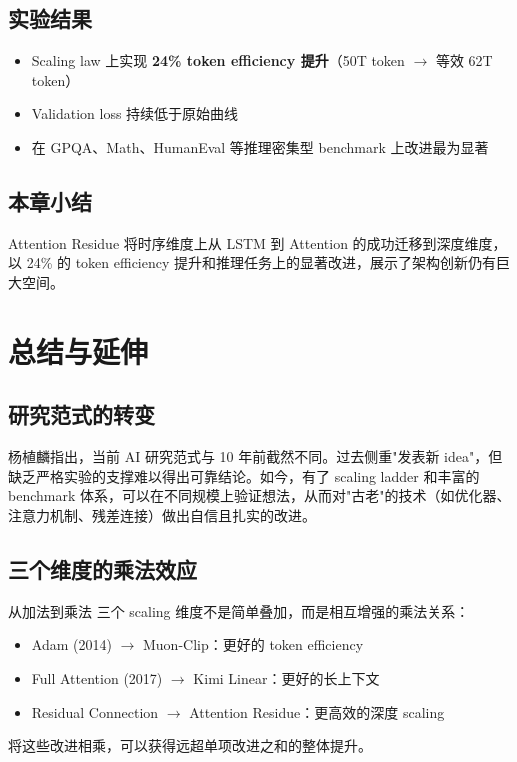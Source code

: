 \documentclass[a4paper]{article}
\begin{document}
\subsection{实验结果}

\begin{itemize}
    \item Scaling law 上实现 \textbf{24\% token efficiency 提升}（50T token $\rightarrow$ 等效 62T token）
    \item Validation loss 持续低于原始曲线
    \item 在 GPQA、Math、HumanEval 等推理密集型 benchmark 上改进最为显著
\end{itemize}

\subsection{本章小结}

Attention Residue 将时序维度上从 LSTM 到 Attention 的成功迁移到深度维度，以 24\% 的 token efficiency 提升和推理任务上的显著改进，展示了架构创新仍有巨大空间。


\section{总结与延伸}

\subsection{研究范式的转变}

杨植麟指出，当前 AI 研究范式与 10 年前截然不同。过去侧重"发表新 idea"，但缺乏严格实验的支撑难以得出可靠结论。如今，有了 scaling ladder 和丰富的 benchmark 体系，可以在不同规模上验证想法，从而对"古老"的技术（如优化器、注意力机制、残差连接）做出自信且扎实的改进。

\subsection{三个维度的乘法效应}

\begin{importantbox}{从加法到乘法}
三个 scaling 维度不是简单叠加，而是相互增强的乘法关系：
\begin{itemize}
    \item Adam (2014) $\rightarrow$ Muon-Clip：更好的 token efficiency
    \item Full Attention (2017) $\rightarrow$ Kimi Linear：更好的长上下文
    \item Residual Connection $\rightarrow$ Attention Residue：更高效的深度 scaling
\end{itemize}
将这些改进相乘，可以获得远超单项改进之和的整体提升。
\end{importantbox}
\end{document}
